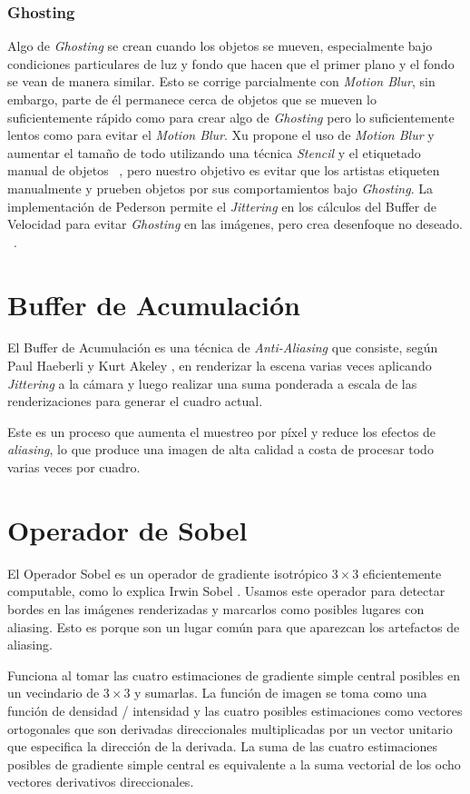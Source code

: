 \documentclass[pregrado]{tesis-usb} %
\begin{document}
\subsubsection{Ghosting} 
Algo de \textit{Ghosting} se crean cuando los objetos se mueven, especialmente bajo condiciones particulares de luz y fondo que hacen que el primer plano y el fondo se vean de manera similar. Esto se corrige parcialmente con \textit{Motion Blur}, sin embargo, parte de él permanece cerca de objetos que se mueven lo suficientemente rápido como para crear algo de \textit{Ghosting} pero lo suficientemente lentos como para evitar el \textit{Motion Blur}. Xu propone el uso de \textit{Motion Blur} y aumentar el tamaño de todo utilizando una técnica \textit{Stencil} y el etiquetado manual de objetos ~\cite{XU2016}, pero nuestro objetivo es evitar que los artistas etiqueten manualmente y prueben objetos por sus comportamientos bajo \textit{Ghosting}. La implementación de Pederson permite el \textit{Jittering} en los cálculos del Buffer de Velocidad para evitar \textit{Ghosting} en las imágenes, pero crea desenfoque no deseado. ~\cite{Fuglsand2016}. 

\section{Buffer de Acumulación}
El Buffer de Acumulación es una técnica de \textit{Anti-Aliasing} que consiste, según Paul Haeberli y Kurt Akeley \cite{Haeberli1990}, en renderizar la escena varias veces aplicando \textit{Jittering} a la cámara y luego realizar una suma ponderada a escala de las renderizaciones para generar el cuadro actual.

Este es un proceso que aumenta el muestreo por píxel y reduce los efectos de \textit{aliasing}, lo que produce una imagen de alta calidad a costa de procesar todo varias veces por cuadro.


\section{Operador de Sobel}
El Operador Sobel es un operador de gradiente isotrópico $3\times 3$ eficientemente computable, como lo explica Irwin Sobel \cite{Sobel2014}. Usamos este operador para detectar bordes en las imágenes renderizadas y marcarlos como posibles lugares con aliasing. Esto es porque son un lugar común para que aparezcan los artefactos de aliasing. 

Funciona al tomar las cuatro estimaciones de gradiente simple central posibles en un vecindario de $3\times 3$ y sumarlas. La función de imagen se toma como una función de densidad / intensidad y las cuatro posibles estimaciones como vectores ortogonales que son derivadas direccionales multiplicadas por un vector unitario que especifica la dirección de la derivada. La suma de las cuatro estimaciones posibles de gradiente simple central es equivalente a la suma vectorial de los ocho vectores derivativos direccionales.
\end{document}
